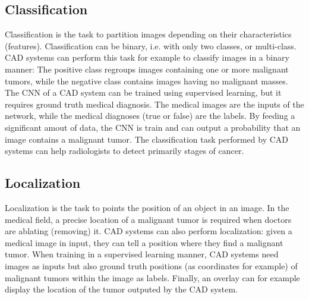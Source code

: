 \subsection{Classification}
Classification is the task to partition images depending on their characteristics (features). Classification can be binary, i.e. with only two classes, or multi-class. CAD systems can perform this task for example to classify images in a binary manner: The positive class regroups images containing one or more malignant tumors, while the negative class contains images having no malignant masses. The CNN of a CAD system can be trained using supervised learning, but it requires ground truth medical diagnosis. The medical images are the inputs of the network, while the medical diagnoses (true or false) are the labels. By feeding a significant amout of data, the CNN is train and can output a probability that an image contains a malignant tumor. The classification task performed by CAD systems can help radiologists to detect primarily stages of cancer.

\subsection{Localization}
Localization is the task to points the position of an object in an image. In the medical field, a precise location of a malignant tumor is required when doctors are ablating (removing) it. CAD systems can also perform localization: given a medical image in input, they can tell a position where they find a malignant tumor. When training in a supervised learning manner, CAD systems need images as inputs but also ground truth positions (as coordinates for example) of malignant tumors within the image as labels. Finally, an overlay can for example display the location of the tumor outputed by the CAD system.

